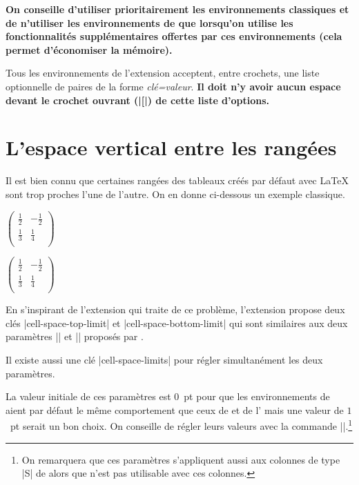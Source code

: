 \documentclass[dvipsnames]{article}%
\begin{document}
\medskip
\textbf{On conseille d'utiliser prioritairement les environnements classiques et de
n'utiliser les environnements de  que lorsqu'on utilise les
fonctionnalités supplémentaires offertes par ces environnements (cela permet
d'économiser la mémoire).}

\medskip
Tous les environnements de l'extension  acceptent, entre
crochets, une liste optionnelle de paires de la forme \textsl{clé=valeur}.
{\bfseries Il doit n'y avoir aucun espace devant le crochet ouvrant (|[|) de
  cette liste d'options.}


\section{L'espace vertical entre les rangées}

\label{cell-space}

Il est bien connu que certaines rangées des tableaux créés par défaut avec
LaTeX sont trop proches l'une de l'autre. On en donne ci-dessous un exemple
classique.

\medskip
\begin{Code}[width=9cm]
$\begin{pmatrix}
\frac{1}{2} & -\frac{1}{2} \\
\frac{1}{3} & \frac{1}{4} \\
\end{pmatrix}$
\end{Code}
$\begin{pmatrix}
\frac{1}{2} & -\frac{1}{2} \\
\frac{1}{3} & \frac{1}{4} \\
\end{pmatrix}$

\medskip
En s'inspirant de l'extension  qui traite de ce problème,
l'extension  propose deux clés |cell-space-top-limit| et
|cell-space-bottom-limit| qui sont similaires aux deux paramètres
|\cellspacetoplimit| et |\cellspacebottomlimit| proposés par .

Il existe aussi une clé |cell-space-limits| pour régler simultanément les deux
paramètres.

La valeur initiale de ces paramètres est $0$~pt pour que les environnements de
 aient par défaut le même comportement que ceux de 
et de l' mais une valeur de $1$~pt serait un bon choix. On
conseille de régler leurs valeurs avec la commande
|\NiceMatrixOptions|.\footnote{On remarquera que ces paramètres s'appliquent
  aussi aux colonnes de type |S| de  alors que 
  n'est pas utilisable avec ces colonnes.}
\end{document}
